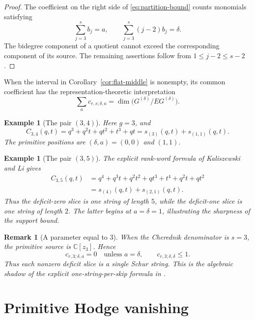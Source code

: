 \documentclass[11pt]{article}
\newtheorem{remark}[theorem]{Remark}
\newtheorem{example}[theorem]{Example}
\newcommand{\C}{\mathbb{C}}
\begin{document}
\begin{proof}
The coefficient on the right side of \eqref{eq:partition-bound}
counts monomials satisfying
\[
 \sum_{j=3}^s b_j=a,
 \qquad
 \sum_{j=3}^s(j-2)b_j=\delta.
\]
The bidegree component of a quotient cannot exceed the corresponding
component of its source.  The remaining assertions follow from
$1\leq j-2\leq s-2$.
\end{proof}

When the interval in Corollary~\ref{cor:flat-middle} is nonempty, its
common coefficient has the representation-theoretic interpretation
\begin{equation}\label{eq:common-middle}
 \sum_a c_{r,s;\delta,a}
 =\dim\bigl(G^{(\delta)}/EG^{(\delta)}\bigr).
\end{equation}

\begin{example}[The pair $(3,4)$]\label{ex:3-4}
Here $g=3$, and
\[
 C_{3,4}(q,t)
 =q^3+q^2t+qt^2+t^3+qt
 =s_{(3)}(q,t)+s_{(1,1)}(q,t).
\]
The primitive positions are $(\delta,a)=(0,0)$ and $(1,1)$.
\end{example}

\begin{example}[The pair $(3,5)$]\label{ex:3-5}
The explicit rank-word formula of Kaliszewski and Li
\cite{KaliszewskiLi} gives
\begin{align*}
 C_{3,5}(q,t)
 &=q^4+q^3t+q^2t^2+qt^3+t^4+q^2t+qt^2\\
 &=s_{(4)}(q,t)+s_{(2,1)}(q,t).
\end{align*}
Thus the deficit-zero slice is one string of length $5$, while the
deficit-one slice is one string of length $2$.  The latter begins at
$a=\delta=1$, illustrating the sharpness of the support bound.
\end{example}

\begin{remark}[A parameter equal to $3$]\label{rem:rank-three}
When the Cherednik denominator is $s=3$, the primitive source is
$\C[z_3]$.  Hence
\[
 c_{r,3;\delta,a}=0\quad\text{unless }a=\delta,
 \qquad
 c_{r,3;\delta,\delta}\leq1.
\]
Thus each nonzero deficit slice is a single Schur string.  This is the
algebraic shadow of the explicit one-string-per-skip formula in
\cite{KaliszewskiLi}.
\end{remark}

\section{Primitive Hodge vanishing}\label{sec:Hodge}
\end{document}
